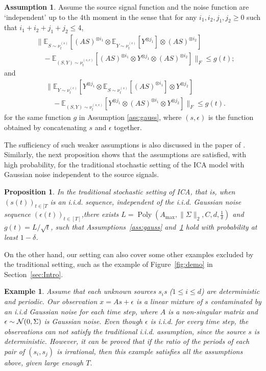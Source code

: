 \documentclass[jmlr]{article}
\newcommand{\cN}{\cal{N}}
\newcommand{\E}{\mathbb{E}}
\newcommand{\iid}{i.i.d.\xspace}
\DeclareMathOperator{\pol}{Poly}
\newcommand{\poly}[1]{\pol\left(#1\right)}
\newtheorem{example}[lemma]{Example}
\newtheorem{prop}[lemma]{Proposition}
\theoremstyle{definition}
\newtheorem{assumption}[lemma]{Assumption}
\newcommand{\eps}{\epsilon}
\begin{document}
\begin{assumption}
\label{ass:independence}
Assume the source signal function and the noise function are `independent' up to the 4th moment in the sense that for any $i_1,i_2,j_1,j_2 \ge 0$ such that $i_1+i_2+j_1+j_2 \le 4$,  
\begin{align*}
& \| \E_{S\sim \nu_t^{(s)}} [(AS)^{\otimes i_1}\otimes \E_{Y\sim \nu_t^{(\epsilon)}} [Y^{\otimes j_1}] \otimes (AS)^{\otimes i_2}]\\
& \quad - \E_{(S, Y)\sim \nu_t^{(s, \epsilon)}} [(AS)^{\otimes i_1}\otimes Y^{\otimes j_1}\otimes (AS)^{\otimes i_2}]  \|_F 
 \le g(t); %
\end{align*}
and 
\begin{align*}
& \| \E_{Y\sim \nu_t^{(\epsilon)}} [Y^{\otimes j_1} \otimes \E_{S\sim \nu_t^{(s)}} [(AS)^{\otimes i_1}] \otimes Y^{\otimes j_2}] \\
& \quad - \E_{(S, Y)\sim \nu_t^{(s, \epsilon)}} [ Y^{\otimes j_1}\otimes (AS)^{\otimes i_1}\otimes Y^{\otimes j_2}] \|_F 
\le g(t). %
\end{align*}
for the same function $g$ in Assumption \ref{ass:gauss}, where $(s,\epsilon)$ is the function obtained by concatenating $s$ and $\epsilon$ together.  
\end{assumption}
The sufficiency of such weaker assumptions is also discussed in the paper of \citet{frieze1996learning}.
Similarly, the next proposition shows that the assumptions are satisfied, with high probability, for the traditional stochastic setting of the ICA model with Gaussian noise independent to the source signals.
\begin{prop}
\label{prop:stochasticAss}
In the traditional stochastic setting of ICA, that is, when $(s(t))_{t\in[T}$ is an \iid sequence, independent of the \iid Gaussian noise sequence $(\epsilon(t))_{t\in[T]}$,there exists $L = \poly{A_{\max}, \|\Sigma\|_2, C, d,\frac{1}{\delta}}$ and $g(t) = L/\sqrt{t}$, such that Assumptions~\ref{ass:gauss} and~\ref{ass:independence} hold with probability at least $1-\delta$.
\end{prop}
On the other hand, our setting can also cover some other examples excluded by the traditional setting, such as the example of Figure~\ref{fig:demo} in Section~\ref{sec:Intro}.
\begin{example} \em
Assume that each unknown sources $s_i$s ($1\le i\le d$) are deterministic and periodic. Our observation $x=As+\eps$ is a linear mixture of $s$ contaminated by an i.i.d Gaussian noise for each time step, where $A$ is a non-singular matrix and $\eps\sim {\cN}(0,\Sigma)$ is Gaussian noise.   
Even though $\eps$ is i.i.d. for every time step, the observations can not satisfy the traditional i.i.d. assumption, since the source $s$ is deterministic. However, it can be proved that if the ratio of the periods of each pair of $(s_i, s_j)$ is irrational, then this example satisfies all the assumptions above, given large enough $T$.   
\end{example}
\end{document}
